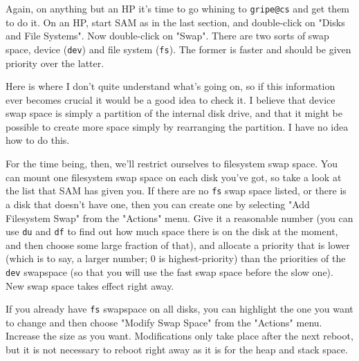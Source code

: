 Again, on anything but an HP it's time to go whining to {\tt gripe@cs} and get them to do it.
On an HP, start SAM as in the last section, and double-click on "Disks and File Systems".
Now double-click on "Swap". There are two sorts of swap space, device ({\tt dev}) and file system
({\tt fs}). The former is faster and should be given priority over the latter.

Here is where I don't quite understand what's going on, so if this information ever becomes
crucial it would be a good idea to check it. I believe that device swap space is simply a 
partition of the internal disk drive, and that it might be possible to create more space simply by
rearranging the partition. I have no idea how to do this.

For the time being, then, we'll restrict ourselves to filesystem swap space. You can mount 
one filesystem swap space on each disk you've got, so take a look at the list that SAM has given you.
If there are no {\tt fs} swap space listed, or there is a disk that doesn't have one, then you can 
create one by selecting "Add Filesystem Swap" from the "Actions" menu. Give it a reasonable 
number (you can use {\tt du} and {\tt df} to find out how much space there is on the disk at the moment,
and then choose some large fraction of that), and allocate a priority that is lower (which is to say,
a larger number; 0 is highest-priority) than the priorities of the {\tt dev} swapspace (so that you 
will use the fast swap space before the slow one). New swap space takes effect right away.

If you already have {\tt fs} swapspace on all disks, you can highlight the one you want to change 
and then choose "Modify Swap Space" from the "Actions" menu. Increase the size as you want.
Modifications only take place after the next reboot, but it is not necessary to reboot right away
as it is for the heap and stack space.

